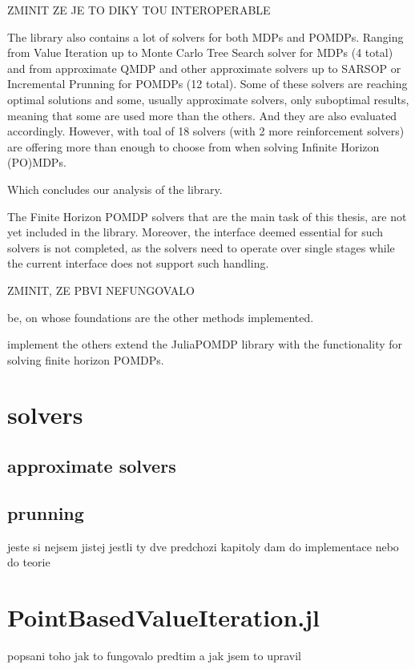 ZMINIT ZE JE TO DIKY TOU INTEROPERABLE

The library also contains a lot of solvers for both MDPs and POMDPs. Ranging from Value Iteration up to Monte Carlo Tree Search solver for MDPs (4 total) and from approximate QMDP and other approximate solvers up to SARSOP or Incremental Prunning for POMDPs (12 total). Some of these solvers are reaching optimal solutions and some, usually approximate solvers, only suboptimal results, meaning that some are used more than the others. And they are also evaluated accordingly. However, with toal of 18 solvers (with 2 more reinforcement solvers) are offering more than enough to choose from when solving Infinite Horizon (PO)MDPs. 

Which concludes our analysis of the library.

The Finite Horizon POMDP solvers that are the main task of this thesis, are not yet included in the library. Moreover, the interface deemed essential for such solvers is not completed, as the solvers need to operate over single stages while the current interface does not support such handling.




ZMINIT, ZE PBVI NEFUNGOVALO


be, on whose foundations are the other methods implemented.






implement the others extend the JuliaPOMDP library with the functionality for solving finite horizon POMDPs. 
\section{solvers}

\subsection{approximate solvers}

\subsection{prunning}

jeste si nejsem jistej jestli ty dve predchozi kapitoly dam do implementace nebo do teorie

\section{PointBasedValueIteration.jl}
popsani toho jak to fungovalo predtim a jak jsem to upravil


